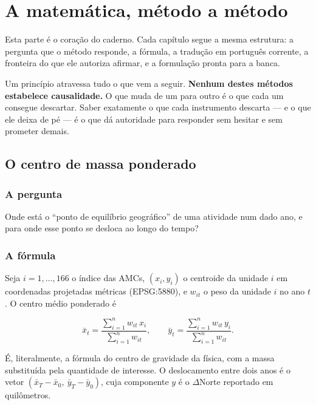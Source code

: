 \part{A matemática, método a método}

Esta parte é o coração do caderno. Cada capítulo segue a mesma estrutura: a
pergunta que o método responde, a fórmula, a tradução em português corrente, a
fronteira do que ele autoriza afirmar, e a formulação pronta para a banca.

Um princípio atravessa tudo o que vem a seguir. \textbf{Nenhum destes métodos
estabelece causalidade.} O que muda de um para outro é o que cada um consegue
descartar. Saber exatamente o que cada instrumento descarta --- e o que ele
deixa de pé --- é o que dá autoridade para responder sem hesitar e sem
prometer demais.

\chapter{O centro de massa ponderado}
\label{cap:centro}

\section{A pergunta}

Onde está o ``ponto de equilíbrio geográfico'' de uma atividade num dado ano, e
para onde esse ponto se desloca ao longo do tempo?

\section{A fórmula}

Seja $i = 1, \dots, 166$ o índice das AMCs, $(x_i, y_i)$ o centroide da unidade
$i$ em coordenadas projetadas métricas (EPSG:5880), e $w_{it}$ o peso da
unidade $i$ no ano $t$. O centro médio ponderado é

\begin{equation}
\bar{x}_t = \frac{\sum_{i=1}^{n} w_{it}\, x_i}{\sum_{i=1}^{n} w_{it}},
\qquad
\bar{y}_t = \frac{\sum_{i=1}^{n} w_{it}\, y_i}{\sum_{i=1}^{n} w_{it}}.
\label{eq:centro}
\end{equation}

É, literalmente, a fórmula do centro de gravidade da física, com a massa
substituída pela quantidade de interesse. O deslocamento entre dois anos é o
vetor $(\bar{x}_T - \bar{x}_0,\ \bar{y}_T - \bar{y}_0)$, cuja componente $y$ é o
$\Delta$Norte reportado em quilômetros.

